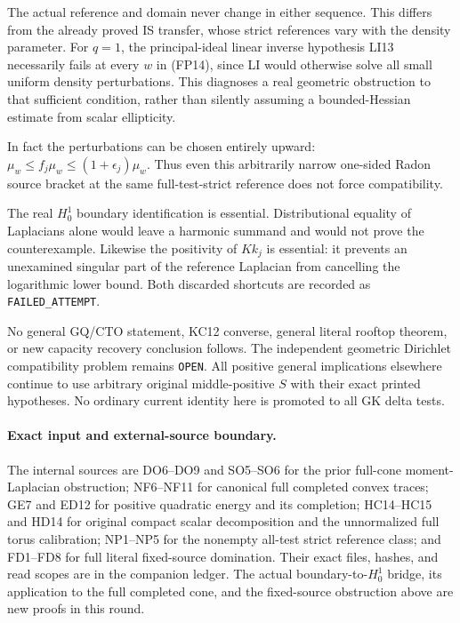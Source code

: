 The actual reference and domain never change in either sequence.
This differs from the already proved IS transfer, whose strict
references vary with the density parameter. For $q=1$, the
principal-ideal linear inverse hypothesis LI13 necessarily fails
at every $w$ in (FP14), since LI would otherwise solve all small
uniform density perturbations. This diagnoses a real geometric
obstruction to that sufficient condition, rather than silently
assuming a bounded-Hessian estimate from scalar ellipticity.

In fact the perturbations can be chosen entirely upward:
$\mu_w\le f_j\mu_w\le(1+\epsilon_j)\mu_w$.
Thus even this arbitrarily narrow one-sided Radon source bracket
at the same full-test-strict reference does not force compatibility.

The real $H_0^1$ boundary identification is essential. Distributional
equality of Laplacians alone would leave a harmonic summand and
would not prove the counterexample. Likewise the positivity of
$Kk_j$ is essential: it prevents an unexamined singular part of
the reference Laplacian from cancelling the logarithmic lower bound.
Both discarded shortcuts are recorded as \texttt{FAILED\_ATTEMPT}.

No general GQ/CTO statement, KC12 converse, general literal rooftop
theorem, or new capacity recovery conclusion follows. The independent
geometric Dirichlet compatibility problem remains \texttt{OPEN}.
All positive general implications elsewhere continue to use arbitrary
original middle-positive $S$ with their exact printed hypotheses.
No ordinary current identity here is promoted to all GK delta tests.

\paragraph{Exact input and external-source boundary.}
The internal sources are DO6--DO9 and SO5--SO6 for the prior
full-cone moment-Laplacian obstruction; NF6--NF11 for canonical
full completed convex traces;
GE7 and ED12 for positive quadratic energy and its completion;
HC14--HC15 and HD14 for original compact scalar decomposition and
the unnormalized full torus calibration; NP1--NP5 for the nonempty
all-test strict reference class; and FD1--FD8 for full literal
fixed-source domination. Their exact files, hashes, and read scopes
are in the companion ledger. The actual boundary-to-$H_0^1$ bridge,
its application to the full completed cone, and the fixed-source
obstruction above are new proofs in this round.

